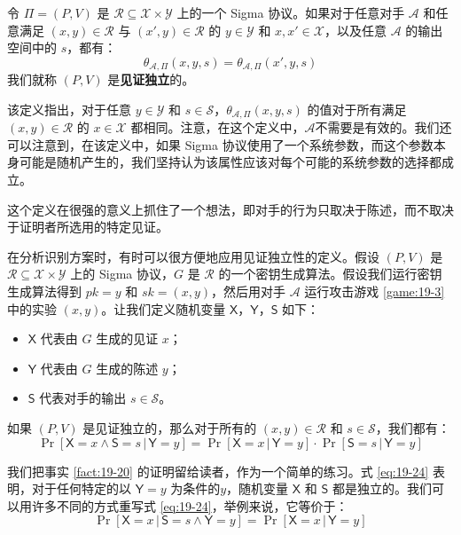 \begin{definition}
令 $\Pi=(P,V)$ 是 $\mathcal{R}\subseteq\mathcal{X}×\mathcal{Y}$ 上的一个 Sigma 协议。如果对于任意对手 $\mathcal{A}$ 和任意满足 $(x,y)\in\mathcal{R}$ 与 $(x',y)\in\mathcal{R}$ 的 $y\in\mathcal{Y}$ 和 $x,x'\in\mathcal{X}$，以及任意 $\mathcal{A}$ 的输出空间中的 $s$，都有：
\[
\theta_{\mathcal{A},\Pi}(x,y,s)=
\theta_{\mathcal{A},\Pi}(x',y,s)
\]
我们就称 $(P,V)$ 是\textbf{见证独立}的。
\end{definition}

该定义指出，对于任意 $y\in\mathcal{Y}$ 和 $s\in\mathcal{S}$，$\theta_{\mathcal{A},\Pi}(x,y,s)$ 的值对于所有满足 $(x,y)\in\mathcal{R}$ 的 $x\in\mathcal{X}$ 都相同。注意，在这个定义中，$\mathcal{A}$不需要是有效的。我们还可以注意到，在该定义中，如果 Sigma 协议使用了一个系统参数，而这个参数本身可能是随机产生的，我们坚持认为该属性应该对每个可能的系统参数的选择都成立。

这个定义在很强的意义上抓住了一个想法，即对手的行为只取决于陈述，而不取决于证明者所选用的特定见证。

在分析识别方案时，有时可以很方便地应用见证独立性的定义。假设 $(P,V)$ 是 $\mathcal{R}\subseteq\mathcal{X}\times\mathcal{Y}$ 上的 Sigma 协议，$G$ 是 $\mathcal{R}$ 的一个密钥生成算法。假设我们运行密钥生成算法得到 $pk=y$ 和 $sk=(x,y)$，然后用对手 $\mathcal{A}$ 运行攻击游戏 \ref{game:19-3} 中的实验 $(x,y)$。让我们定义随机变量 $\mathsf{X}$，$\mathsf{Y}$，$\mathsf{S}$ 如下：
\begin{itemize}
	\item $\mathsf{X}$ 代表由 $G$ 生成的见证 $x$；
	\item $\mathsf{Y}$ 代表由 $G$ 生成的陈述 $y$；
	\item $\mathsf{S}$ 代表对手的输出 $s\in\mathcal{S}$。
\end{itemize}

\begin{fact}\label{fact:19-20}
如果 $(P,V)$ 是见证独立的，那么对于所有的 $(x,y)\in\mathcal{R}$ 和 $s\in\mathcal{S}$，我们都有：
\begin{equation}\label{eq:19-24}
\Pr[\mathsf{X}=x\land\mathsf{S}=s\,|\,\mathsf{Y}=y]=
\Pr[\mathsf{X}=x\,|\,\mathsf{Y}=y]\cdot
\Pr[\mathsf{S}=s\,|\,\mathsf{Y}=y]
\end{equation}
\end{fact}

我们把事实 \ref{fact:19-20} 的证明留给读者，作为一个简单的练习。式 \ref{eq:19-24} 表明，对于任何特定的以 $\mathsf{Y}=y$ 为条件的$y$，随机变量 $\mathsf{X}$ 和 $\mathsf{S}$ 都是独立的。我们可以用许多不同的方式重写式 \ref{eq:19-24}，举例来说，它等价于：
\begin{equation}\label{eq:19-25}
\Pr[\mathsf{X}=x\,|\,\mathsf{S}=s\land\mathsf{Y}=y]=
\Pr[\mathsf{X}=x\,|\,\mathsf{Y}=y]
\end{equation}


